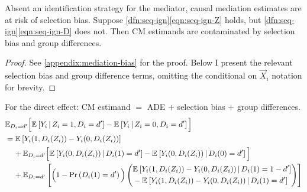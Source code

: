 \begin{theorem}
    \label{thm:selection-bias}
    Absent an identification strategy for the mediator, causal mediation estimates are at risk of selection bias.
    Suppose \ref{dfn:seq-ign}\eqref{eqn:seq-ign-Z} holds, but \ref{dfn:seq-ign}\eqref{eqn:seq-ign-D} does not.
    Then CM estimands are contaminated by selection bias and group differences.
\end{theorem}
\begin{proof}
    See \autoref{appendix:mediation-bias} for the proof.
    Below I present the relevant selection bias and group difference terms, omitting the conditional on $\vec X_i$ notation for brevity.
\end{proof}

\noindent
For the direct effect: CM estimand $=$ ADE $+$ selection bias $+$ group differences.
\begin{align*}
    & \mathbb E_{D_i = d'} \Big[
        \Egiven{Y_i}{Z_i = 1, D_i = d'} - \Egiven{Y_i}{Z_i = 0, D_i = d'} \Big] \\
    & = \E{Y_i(1, D_i(Z_i)) - Y_i(0, D_i(Z_i))} \\
    & \;\;\;\; + \mathbb E_{D_i = d'} \Big[
        \Egiven{Y_i(0, D_i(Z_i))}{D_i(1) = d'} 
        - \Egiven{Y_i(0, D_i(Z_i))}{D_i(0) = d'} \Big] \\
    & \;\;\;\; + \E[D_i = d']{
        \Big(1 - \Prob{D_i(1) = d'} \Big)
        \left( \begin{aligned}
            &\Egiven{Y_i(1, D_i(Z_i)) - Y_i(0, D_i(Z_i))}{D_i(1) = 1-d'} \\ 
            &  - \Egiven{Y_i(1, D_i(Z_i)) - Y_i(0, D_i(Z_i))}{D_i(1) = d'}
            \end{aligned} \right) }
\end{align*}

